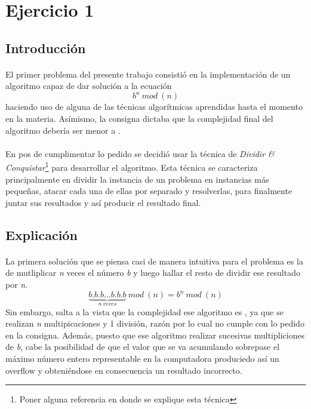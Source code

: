 \section{Ejercicio 1}

\subsection{Introducción}

\paragraph{}
El primer problema del presente trabajo consistió en la implementación de un algoritmo capaz de dar solución a la ecuación 
	\begin{equation} 
		b^n\ mod\ (n)
	\label{problema}
	\end{equation}
haciendo uso de alguna de las técnicas algorítmicas aprendidas hasta el momento en la materia. Asímismo, la consigna dictaba que la complejidad final del algoritmo debería ser menor a .

\paragraph{}
En pos de cumplimentar lo pedido se decidió usar la técnica de \textit{Dividir \& Conquistar}\footnote{Poner alguna referencia 	en donde se explique esta técnica} para desarrollar el algoritmo. Esta técnica se caracteriza principalmente en dividir la instancia de un problema en instancias más pequeñas, atacar cada una de ellas por separado y resolverlas, para finalmente juntar sus resultados y así producir el resultado final.


\subsection{Explicación}

\paragraph{}
La primera solución que se piensa casi de manera intuitiva para el problema es la de mutliplicar \textit{n} veces el número \textit{b} y luego hallar el resto de dividir ese resultado por \textit{n}. 
	\begin{equation}
		\underbrace{b.b.b \hdots b.b.b}_{n\ veces}\ mod\ (n)  = b^n\ mod\ (n)
	\label{primera_idea}		
	\end{equation}
Sin embargo, salta a la vista que la complejidad ese algoritmo es , ya que se realizan \textit{n} multipicaciones y 1 división, razón por lo cual no cumple con lo pedido en la consigna. Además, puesto que ese algoritmo realizar sucesivas multipliciones de \textit{b}, cabe la posibilidad de que el valor que se va acumulando sobrepase el máximo número entero representable en la computadora produciedo así un overflow y obteniéndose en consecuencia un resultado incorrecto.

